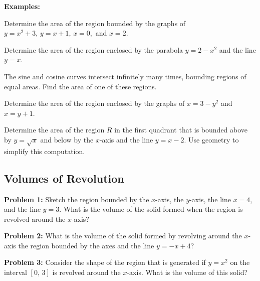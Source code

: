 \documentclass[addpoints, 12pt]{exam}
\begin{document}
\textbf{Examples:}
\begin{questions}
    \question Determine the area of the region bounded by the graphs of $y=x^2+3,\,y=x+1,\,x=0,$ and $x=2$.
    
    \question Determine the area of the region enclosed by the parabola $y=2-x^2$ and the line $y=x$.
    
    \newpage
    
    \question The sine and cosine curves intersect infinitely many times, bounding regions of equal areas. Find the area of one of these regions.
    
    \question Determine the area of the region enclosed by the graphs of $x=3-y^2$ and $x=y+1$.
    
    \question Determine the area of the region $R$ in the first quadrant that is bounded above by $y=\sqrt{x}$ and below by the $x$-axis and the line $y=x-2$. Use geometry to simplify this computation.
\end{questions}




\newpage
{}
\subsection*{Volumes of Revolution}
\textbf{Problem 1:} Sketch the region bounded by the $x$-axis, the $y$-axis, the line $x=4$, and the line $y=3$. What is the volume of the solid formed when the region is revolved around the $x$-axis?

\textbf{Problem 2:} What is the volume of the solid formed by revolving around the $x$-axis the region bounded by the axes and the line $y=-x+4$?

\textbf{Problem 3:} Consider the shape of the region that is generated if $y=x^2$ on the interval $[0,\,3]$ is revolved around the $x$-axis. What is the volume of this solid?

\newpage
\end{document}
